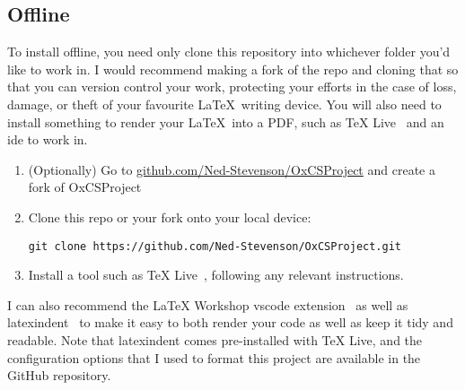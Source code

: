 \subsection{Offline}
\label{sec:installation/offline}

To install offline, you need only clone this repository into whichever folder you'd like to work
in. I would recommend making a fork of the repo and cloning that so that you can version control
your work, protecting your efforts in the case of loss, damage, or theft of your favourite \LaTeX\
writing device. You will also need to install something to render your \LaTeX\ into a PDF, such as
TeX Live~\cite{TeXLiveTeX} and an \acrshort{ide} to work in.

\begin{enumerate}
	\item (Optionally) Go to \url{github.com/Ned-Stevenson/OxCSProject} and create a fork of
	      OxCSProject
	\item Clone this repo or your fork onto your local device:

	      \verb*|git clone https://github.com/Ned-Stevenson/OxCSProject.git|
	\item Install a tool such as TeX Live~\cite{TeXLiveTeX}, following any relevant instructions.
\end{enumerate}

I can also recommend the LaTeX Workshop \acrshort{vscode} extension~\cite{LaTeXWorkshopVisual} as
well as latexindent~\cite{hughesCmhughesLatexindentpl2024} to make it easy to both render your
code as well as keep it tidy and readable. Note that latexindent comes pre-installed with TeX
Live, and the configuration options that I used to format this project are available in the GitHub
repository.

